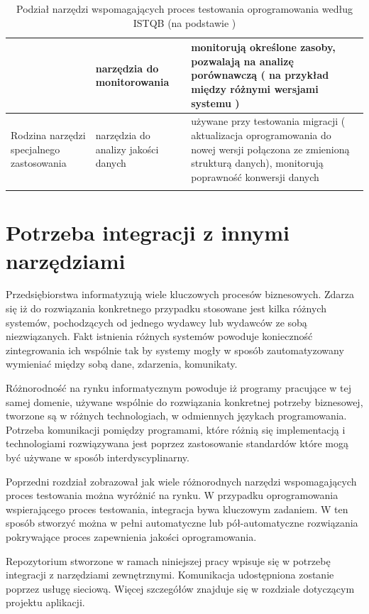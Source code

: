 \begin{longtable}{| p{4cm} | p{4cm} | p{8cm} |}
& narzędzia do monitorowania & monitorują określone zasoby, pozwalają na analizę porównawczą ( na przykład między różnymi wersjami systemu ) \\ \hline
\hline
\multirow{1}{4cm}{Rodzina narzędzi specjalnego zastosowania} &
narzędzia do analizy jakości danych & używane przy testowania migracji ( aktualizacja oprogramowania do nowej wersji połączona ze zmienioną strukturą danych), monitorują poprawność konwersji danych \\
\hline
\caption{Podział narzędzi wspomagających proces testowania oprogramowania według ISTQB (na podstawie  \cite{istqb})}\\
\end{longtable}

\section{Potrzeba integracji z innymi narzędziami}

Przedsiębiorstwa informatyzują wiele kluczowych procesów biznesowych. Zdarza się iż do rozwiązania konkretnego przypadku stosowane jest kilka różnych systemów, pochodzących od jednego wydawcy lub wydawców ze sobą niezwiązanych. Fakt istnienia różnych systemów powoduje konieczność zintegrowania ich wspólnie tak by systemy mogły w sposób zautomatyzowany wymieniać między sobą dane, zdarzenia, komunikaty.

Różnorodność na rynku informatycznym powoduje iż programy pracujące w tej samej domenie, używane wspólnie do rozwiązania konkretnej potrzeby biznesowej, tworzone są w różnych technologiach, w odmiennych językach programowania. Potrzeba komunikacji pomiędzy programami, które różnią się implementacją i technologiami rozwiązywana jest poprzez zastosowanie standardów które mogą być używane w sposób interdyscyplinarny.

Poprzedni rozdział zobrazował jak wiele różnorodnych narzędzi wspomagających proces testowania można wyróżnić na rynku. W przypadku oprogramowania wspierającego proces testowania, integracja bywa kluczowym zadaniem. W ten sposób stworzyć można w pełni automatyczne lub pół-automatyczne rozwiązania pokrywające proces zapewnienia jakości oprogramowania. 

Repozytorium stworzone w ramach niniejszej pracy wpisuje się w potrzebę integracji z narzędziami zewnętrznymi. Komunikacja udostępniona zostanie poprzez usługę sieciową. Więcej szczegółów znajduje się w rozdziale dotyczącym projektu aplikacji.

